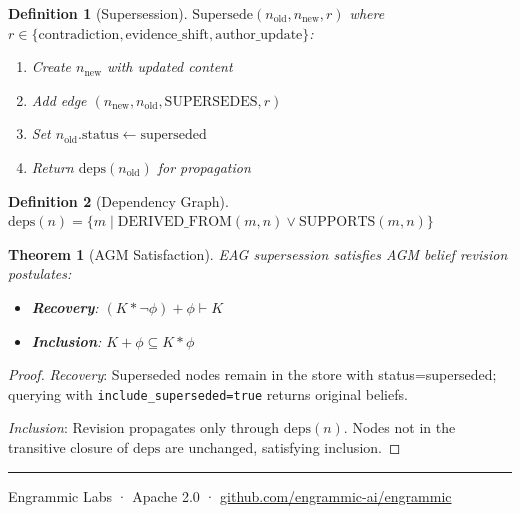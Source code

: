 \documentclass[11pt,a4paper]{article}
\newtheorem{definition}{Definition}[section]
\newtheorem{theorem}{Theorem}[section]
\begin{document}
\begin{definition}[Supersession]
\label{def:supersession}
$\text{Supersede}(n_{\text{old}}, n_{\text{new}}, r)$ where $r \in \{\text{contradiction}, \text{evidence\_shift}, \text{author\_update}\}$:
\begin{enumerate}[noitemsep]
    \item Create $n_{\text{new}}$ with updated content
    \item Add edge $(n_{\text{new}}, n_{\text{old}}, \text{SUPERSEDES}, r)$
    \item Set $n_{\text{old}}.\text{status} \gets \text{superseded}$
    \item Return $\text{deps}(n_{\text{old}})$ for propagation
\end{enumerate}
\end{definition}

\begin{definition}[Dependency Graph]
\label{def:deps}
$\text{deps}(n) = \{m \mid \text{DERIVED\_FROM}(m, n) \vee \text{SUPPORTS}(m, n)\}$
\end{definition}

\begin{theorem}[AGM Satisfaction]
\label{thm:agm}
EAG supersession satisfies AGM belief revision postulates:
\begin{itemize}[noitemsep]
    \item \textbf{Recovery}: $(K * \neg\phi) + \phi \vdash K$
    \item \textbf{Inclusion}: $K + \phi \subseteq K * \phi$
\end{itemize}
\end{theorem}

\begin{proof}
\textit{Recovery}: Superseded nodes remain in the store with status=superseded; querying with \texttt{include\_superseded=true} returns original beliefs.

\textit{Inclusion}: Revision propagates only through $\text{deps}(n)$. Nodes not in the transitive closure of $\text{deps}$ are unchanged, satisfying inclusion.
\end{proof}

\vspace{2em}
\hrule
\vspace{0.5em}
\begin{center}
\small
Engrammic Labs · Apache 2.0 · \href{https://github.com/engrammic-ai/engrammic}{github.com/engrammic-ai/engrammic}
\end{center}
\end{document}

